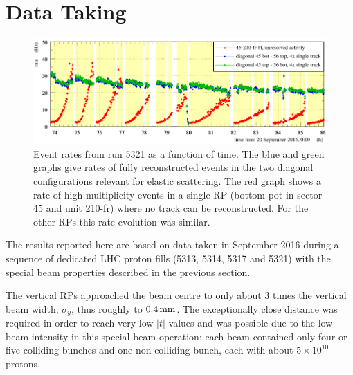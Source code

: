 \section{Data Taking}
\label{sec:data taking}

\begin{figure}
\begin{center}
\includegraphics{fig/rates_vs_time.pdf}
\caption{%
Event rates from run 5321 as a function of time. The blue and green graphs give rates of fully reconstructed events in the two diagonal configurations relevant for elastic scattering. The red graph shows a rate of high-multiplicity events in a single RP (bottom pot in sector 45 and unit 210-fr) where no track can be reconstructed. For the other RPs this rate evolution was similar.
}
\label{fig:rates_vs_time}
\end{center}
\end{figure}

The results reported here are based on data taken in September 2016 during a sequence of dedicated LHC proton fills (5313, 5314, 5317 and 5321) with the special beam properties described in the previous section.



The vertical RPs approached the beam centre to only about 3 times the vertical beam width, $\sigma_{y}$, thus roughly to $0.4\,{\rm mm}$. The exceptionally close distance was required in order to reach very low $|t|$ values and was possible due to the low beam intensity in this special beam operation: each beam contained only four or five colliding bunches and one non-colliding bunch, each with about $5\times 10^{10}$ protons.

